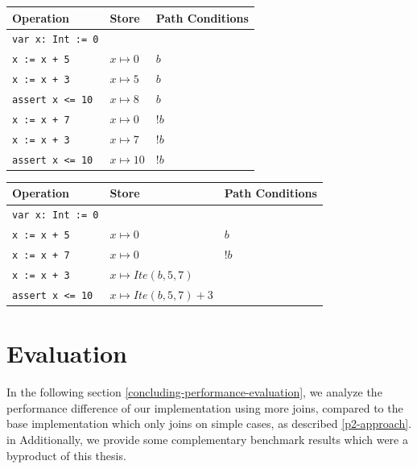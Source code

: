 \documentclass[11pt]{article}
\begin{document}
    \begin{center}
        \begin{tabular}{ l|l|l }
            Operation & Store & Path Conditions \\
            \hline
            \texttt{var x: Int := 0} & & \\
            \texttt{x := x + 5} & $x \mapsto 0$ & $b$ \\
            \texttt{x := x + 3} & $x \mapsto 5$ & $b$ \\
            \texttt{assert x <= 10} & $x \mapsto 8$ & $b$ \\
            \texttt{x := x + 7} & $x \mapsto 0$ & $!b$ \\
            \texttt{x := x + 3} & $x \mapsto 7$ & $!b$ \\
            \texttt{assert x <= 10} & $x \mapsto 10$ & $!b$ \\
        \end{tabular}
        \label{execution-1}
    \end{center}

    \begin{center}
        \begin{tabular}{ l|l|l }
            Operation & Store & Path Conditions \\
            \hline
            \texttt{var x: Int := 0} & & \\
            \texttt{x := x + 5} & $x \mapsto 0$ & $b$ \\
            \texttt{x := x + 7} & $x \mapsto 0$ & $!b$ \\
            \texttt{x := x + 3} & $x \mapsto Ite(b, 5, 7)$ & \\
            \texttt{assert x <= 10} & $x \mapsto Ite(b, 5, 7) + 3$ & \\
        \end{tabular}
        \label{execution-2}
    \end{center}

    \newpage
    \section{Evaluation}

    In the following section \ref{concluding-performance-evaluation}, we analyze the performance difference
    of our implementation using more joins, compared to the base implementation
    which only joins on simple cases, as described \ref{p2-approach}. in Additionally, we provide some complementary benchmark results
    which were a byproduct of this thesis. 
\end{document}

